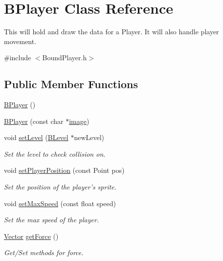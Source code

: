 \hypertarget{class_b_player}{\section{\-B\-Player \-Class \-Reference}
\label{class_b_player}
}


\-This will hold and draw the data for a \-Player. \-It will also handle player movement.  




{\ttfamily \#include $<$\-Bound\-Player.\-h$>$}

\subsection*{\-Public \-Member \-Functions}
\begin{DoxyCompactItemize}
\item 
\hyperlink{class_b_player_a81ff25cbd1dc216784b14547f8e92bcc}{\-B\-Player} ()
\item 
\hyperlink{class_b_player_adf6478c51df592730b02d0174f91351a}{\-B\-Player} (const char $\ast$\hyperlink{_game_list_8h_ac745ab21f82aa96829863dcfc37ef5a8}{image})
\item 
void \hyperlink{class_b_player_a03add0a9a55d81912897518d94daf52f}{set\-Level} (\hyperlink{class_b_level}{\-B\-Level} $\ast$new\-Level)
\begin{DoxyCompactList}\small\item\em \-Set the level to check collision on. \end{DoxyCompactList}\item 
void \hyperlink{class_b_player_a3772d37e802a5fcad52a753450853441}{set\-Player\-Position} (const \-Point pos)
\begin{DoxyCompactList}\small\item\em \-Set the position of the player's sprite. \end{DoxyCompactList}\item 
void \hyperlink{class_b_player_ace0ec1b13a62c932950a86a469d0263f}{set\-Max\-Speed} (const float speed)
\begin{DoxyCompactList}\small\item\em \-Set the max speed of the player. \end{DoxyCompactList}\item 
\hyperlink{struct_vector}{\-Vector} \hyperlink{class_b_player_a33b7d635e3aa3c7a4796eabc4205cc58}{get\-Force} ()
\begin{DoxyCompactList}\small\item\em \-Get/\-Set methods for force. \end{DoxyCompactList}\item 

\end{DoxyCompactItemize}
